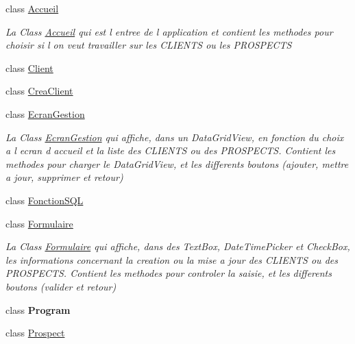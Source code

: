\begin{DoxyCompactItemize}
\item 
class \mbox{\hyperlink{class_d_b___projet___active_1_1_accueil}{Accueil}}
\begin{DoxyCompactList}\small\item\em La Class \mbox{\hyperlink{class_d_b___projet___active_1_1_accueil}{Accueil}} qui est l entree de l application et contient les methodes pour choisir si l on veut travailler sur les C\+L\+I\+E\+N\+TS ou les P\+R\+O\+S\+P\+E\+C\+TS \end{DoxyCompactList}\item 
class \mbox{\hyperlink{class_d_b___projet___active_1_1_client}{Client}}
\item 
class \mbox{\hyperlink{class_d_b___projet___active_1_1_crea_client}{Crea\+Client}}
\item 
class \mbox{\hyperlink{class_d_b___projet___active_1_1_ecran_gestion}{Ecran\+Gestion}}
\begin{DoxyCompactList}\small\item\em La Class \mbox{\hyperlink{class_d_b___projet___active_1_1_ecran_gestion}{Ecran\+Gestion}} qui affiche, dans un Data\+Grid\+View, en fonction du choix a l ecran d accueil et la liste des C\+L\+I\+E\+N\+TS ou des P\+R\+O\+S\+P\+E\+C\+TS. Contient les methodes pour charger le Data\+Grid\+View, et les differents boutons (ajouter, mettre a jour, supprimer et retour) \end{DoxyCompactList}\item 
class \mbox{\hyperlink{class_d_b___projet___active_1_1_fonction_s_q_l}{Fonction\+S\+QL}}
\item 
class \mbox{\hyperlink{class_d_b___projet___active_1_1_formulaire}{Formulaire}}
\begin{DoxyCompactList}\small\item\em La Class \mbox{\hyperlink{class_d_b___projet___active_1_1_formulaire}{Formulaire}} qui affiche, dans des Text\+Box, Date\+Time\+Picker et Check\+Box, les informations concernant la creation ou la mise a jour des C\+L\+I\+E\+N\+TS ou des P\+R\+O\+S\+P\+E\+C\+TS. Contient les methodes pour controler la saisie, et les differents boutons (valider et retour) \end{DoxyCompactList}\item 
class {\bfseries Program}
\item 
class \mbox{\hyperlink{class_d_b___projet___active_1_1_prospect}{Prospect}}
\end{DoxyCompactItemize}
